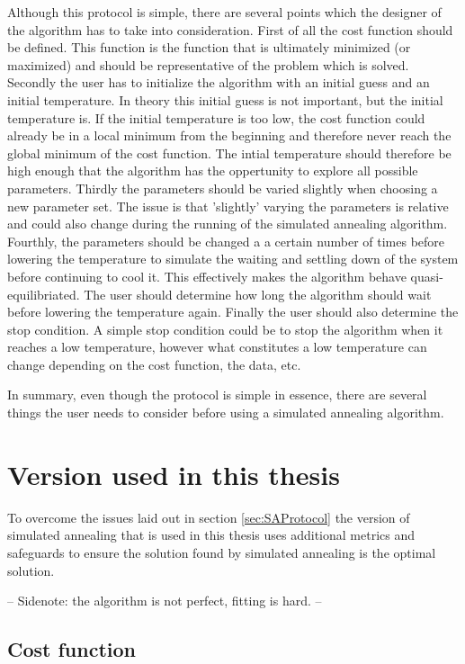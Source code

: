 Although this protocol is simple, there are several points which the designer of the algorithm has to take into consideration. First of all the cost function should be defined. This function is the function that is ultimately minimized (or maximized) and should be representative of the problem which is solved. Secondly the user has to initialize the algorithm with an initial guess and an initial temperature. In theory this initial guess is not important, but the initial temperature is. If the initial temperature is too low, the cost function could already be in a local minimum from the beginning and therefore never reach the global minimum of the cost function. The intial temperature should therefore be high enough that the algorithm has the oppertunity to explore all possible parameters. Thirdly the parameters should be varied slightly when choosing a new parameter set. The issue is that 'slightly' varying the parameters is relative and could also change during the running of the simulated annealing algorithm. Fourthly, the parameters should be changed a a certain number of times before lowering the temperature to simulate the waiting and settling down of the system before continuing to cool it. This effectively makes the algorithm behave quasi-equilibriated. The user should determine how long the algorithm should wait before lowering the temperature again. Finally the user should also determine the stop condition. A simple stop condition could be to stop the algorithm when it reaches a low temperature, however what constitutes a low temperature can change depending on the cost function, the data, etc.

In summary, even though the protocol is simple in essence, there are several things the user needs to consider before using a simulated annealing algorithm.


\section{Version used in this thesis}

To overcome the issues laid out in section \ref{sec:SAProtocol} the version of simulated annealing that is used in this thesis uses additional metrics and safeguards to ensure the solution found by simulated annealing is the optimal solution.

-- Sidenote: the algorithm is not perfect, fitting is hard. --


\subsection{Cost function}

